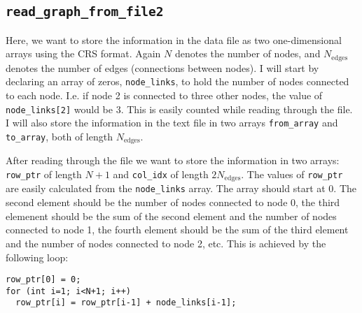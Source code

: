 \documentclass[reprint, english,notitlepage,nofootinbib]{revtex4-1}  %
\begin{document}
\subsection{\texttt{read\_graph\_from\_file2}}

Here, we want to store the information in the data file as two one-dimensional arrays using the CRS format. Again \(N\) denotes the number of nodes, and \(N_{\text{edges}}\) denotes the number of edges (connections between nodes). I will start by declaring an array of zeros, \verb|node_links|, to hold the number of nodes connected to each node. I.e. if node 2 is connected to three other nodes, the value of \verb|node_links[2]| would be 3. This is easily counted while reading through the file. I will also store the information in the text file in two arrays \verb|from_array| and \verb|to_array|, both of length \(N_{\text{edges}}\).

After reading through the file we want to store the information in two arrays: \verb|row_ptr| of length \(N+1\) and \verb|col_idx| of length \(2 N_{\text{edges}}\). The values of \verb|row_ptr| are easily calculated from the \verb|node_links| array. The array should start at 0. The second element should be the number of nodes connected to node 0, the third elemenent should be the sum of the second element and the number of nodes connected to node 1, the fourth element should be the sum of the third element and the number of nodes connected to node 2, etc. This is achieved by the following loop:
\begin{verbatim}
row_ptr[0] = 0;
for (int i=1; i<N+1; i++)
  row_ptr[i] = row_ptr[i-1] + node_links[i-1];
\end{verbatim}
\end{document}
